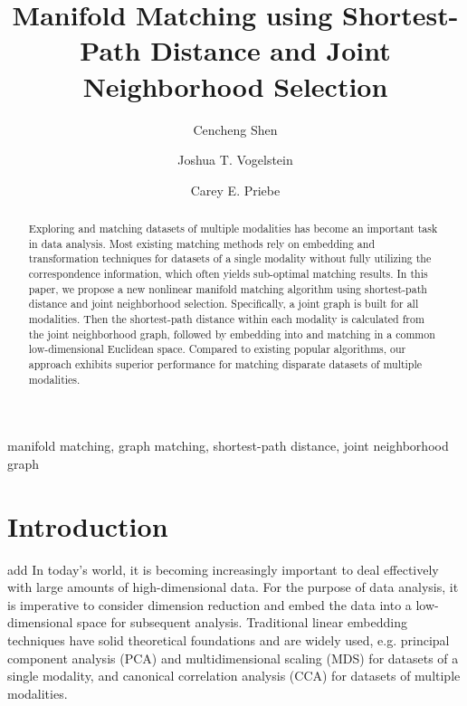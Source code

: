\documentclass[times,twocolumn,final]{elsarticle}
\begin{document}
\begin{frontmatter}
\title{Manifold Matching using Shortest-Path Distance and Joint Neighborhood Selection}
\author[1,2]{Cencheng Shen}
\author[1,3]{Joshua T. Vogelstein}
\author[1,4]{Carey E. Priebe}

\address[1]{Center for Imaging Science, Johns Hopkins University}
\address[2]{Department of Statistics, Temple University}
\address[3]{Department of Biomedical Engineering and Institute for Computational Medicine, Johns Hopkins University}
\address[4]{Department of Applied Mathematics and Statistics, Johns Hopkins University}

\begin{abstract}
Exploring and matching datasets of multiple modalities has become an important task in data analysis. Most existing matching methods rely on embedding and transformation techniques for datasets of a single modality without fully utilizing the correspondence information, which often yields sub-optimal matching results. In this paper, we propose a new nonlinear manifold matching algorithm using shortest-path distance and joint neighborhood selection. Specifically, a joint graph is built for all modalities. Then the shortest-path distance within each modality is calculated from the joint neighborhood graph, followed by embedding into and matching in a common low-dimensional Euclidean space. Compared to existing popular algorithms, our approach exhibits superior performance for matching disparate datasets of multiple modalities. 
\end{abstract}
\begin{keyword}
manifold matching, graph matching, shortest-path distance, joint neighborhood graph
\end{keyword}
\end{frontmatter}

\section{Introduction}
add \citep{JJ2008}
In today's world, it is becoming increasingly important to deal effectively with large amounts of high-dimensional data. For the purpose of data analysis, it is imperative to consider dimension reduction and embed the data into a low-dimensional space for subsequent analysis. Traditional linear embedding techniques have solid theoretical foundations and are widely used, e.g. principal component analysis (PCA) \citep{JolliffePCABook, BishopTipping1999} and multidimensional scaling (MDS) \citep{TorgersonBook, BorgBook, CoxBook} for datasets of a single modality, and canonical correlation analysis (CCA) \citep{Hotelling1936, BachJordan2005} for datasets of multiple modalities. 
\end{document}
